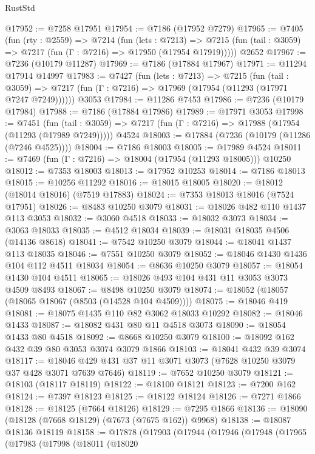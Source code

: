 \begin{lexlean}{RustStd}
\begin{coremodule}
@17952 := @7258 @17951
@17954 := @7186 (@17952 @7279)
@17965 := @7405
    (fun (rty : @2559) =>
    @7214
      (fun (lets : @7213) =>
      @7215 (fun (tail : @3059) => @7217 (fun (Γ : @7216) => @17950 (@17954 @17919)))))
    @2652
@17967 := @7236 (@10179 @11287)
@17969 := @7186 (@17884 @17967)
@17971 := @11294 @17914 @14997
@17983 := @7427
    (fun (lets : @7213) =>
    @7215
      (fun (tail : @3059) =>
      @7217 (fun (Γ : @7216) => @17969 (@17954 (@11293 (@17971 @7247 @7249))))))
    @3053
@17984 := @11286 @7453
@17986 := @7236 (@10179 @17984)
@17988 := @7186 (@17884 @17986)
@17989 := @17971 @3053
@17998 := @7451
    (fun (tail : @3059) => @7217 (fun (Γ : @7216) => @17988 (@17954 (@11293 (@17989 @7249)))))
    @4524
@18003 := @17884 (@7236 (@10179 (@11286 (@7246 @4525))))
@18004 := @7186 @18003
@18005 := @17989 @4524
@18011 := @7469 (fun (Γ : @7216) => @18004 (@17954 (@11293 @18005))) @10250
@18012 := @7353 @18003
@18013 := @17952 @10253
@18014 := @7186 @18013
@18015 := @10256 @11292
@18016 := @18015 @18005
@18020 := @18012 (@18014 @18016) (@7519 @17883)
@18024 := @7353 @18013 @18016 (@7524 @17951)
@18026 := @8483 @10250 @3079
@18031 := @18026 @482 @110 @1437 @113 @3053
@18032 := @3060 @4518
@18033 := @18032 @3073
@18034 := @3063 @18033
@18035 := @4512 @18034
@18039 := @18031 @18035 @4506 (@14136 @8618)
@18041 := @7542 @10250 @3079
@18044 := @18041 @1437 @113 @18035
@18046 := @7551 @10250 @3079
@18052 := @18046 @1430 @1436 @104 @112 @4511 @18034
@18054 := @8636 @10250 @3079
@18057 := @18054 @1430 @104 @4511
@18065 := @18026 @493 @104 @431 @11 @3053 @3073 @4509 @8493
@18067 := @8498 @10250 @3079
@18074 := @18052 (@18057 (@18065 @18067 (@8503 (@14528 @104 @4509))))
@18075 := @18046 @419
@18081 := @18075 @1435 @110 @82 @3062 @18033 @10292
@18082 := @18046 @1433
@18087 := @18082 @431 @80 @11 @4518 @3073
@18090 := @18054 @1433 @80 @4518
@18092 := @8668 @10250 @3079
@18100 := @18092 @162 @432 @39 @80 @3053 @3074 @3079 @1866
@18103 := @18041 @432 @39 @3074
@18117 := @18046 @429 @431 @37 @11 @3071 @3073 (@7628 @10250 @3079 @37 @428 @3071 @7639 @7646)
@18119 := @7652 @10250 @3079
@18121 := @18103 (@18117 @18119)
@18122 := @18100 @18121
@18123 := @7200 @162
@18124 := @7397 @18123
@18125 := @18122 @18124
@18126 := @7271 @1866
@18128 := @18125 (@7664 @18126)
@18129 := @7295 @1866
@18136 := @18090 (@18128 (@7668 @18129) (@7673 (@7675 @162)) @9968)
@18138 := @18087 @18136 @18119
@18158 := @17878
    (@17903
      (@17944
        (@17946
          (@17948
            (@17965
              (@17983
                (@17998
                  (@18011
                    (@18020

\end{coremodule}
\end{lexlean}
